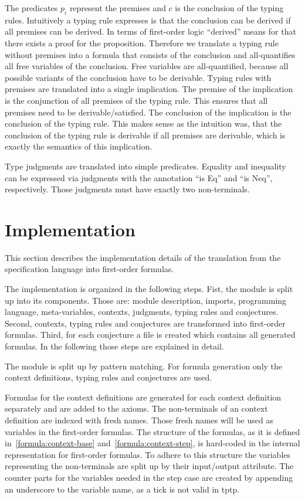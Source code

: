 The predicates $p_i$ represent the premises and $c$ is the conclusion
of the typing rules. Intuitively a typing rule expresses is that the
conclusion can be derived if all premises can be derived. In terms of
first-order logic ``derived'' means for that there exists a proof for
the proposition. Therefore we translate a typing rule without premises
into a formula that consists of the conclusion and all-quantifies all
free variables of the conclusion. Free variables are all-quantified,
because all possible variants of the conclusion have to be derivable.
Typing rules with premises are translated into a single
implication. The premise of the implication is the conjunction of all
premises of the typing rule. This ensures that all premises need to be
derivable/satisfied. The conclusion of the implication is the
conclusion of the typing rule. This makes sense as the intuition was,
that the conclusion of the typing rule is derivable if all premises
are derivable, which is exactly the semantics of this implication.

Type judgments are translated into simple predicates. Equality and
inequality can be expressed via judgments with the annotation ``is
Eq'' and ``is Neq'', respectively. Those judgments must have exactly
two non-terminals.
\section{Implementation}
\label{sec:implementation-fof}
This section describes the implementation details of the translation
from the specification language into first-order formulas.


The implementation is organized in the following steps. Fist, the
module is split up into its components. Those are: module description,
imports, programming language, meta-variables, contexts,
judgments, typing rules and conjectures. Second, contexts, typing
rules and conjectures are transformed into first-order
formulas. Third, for each conjecture a file is created which contains
all generated formulas. In the following those steps are explained in
detail.

The module is split up by pattern matching. For formula generation
only the context definitions, typing rules and conjectures are
used.

Formulas for the context definitions are generated for each context
definition separately and are added to the axioms. The non-terminals
of an context definition are indexed with fresh names. Those fresh
names will be used as variables in the first-order formulas. The
structure of the formulas, as it is defined
in~\ref{formula:context-base} and~\ref{formula:context-step}, is
hard-coded in the internal representation for first-order formulas. To
adhere to this structure the variables representing the non-terminals
are split up by their input/output attribute. The counter parts for
the variables needed in the step case are created by appending an
underscore to the variable name, as a tick is not valid in \gls{tptp}.

